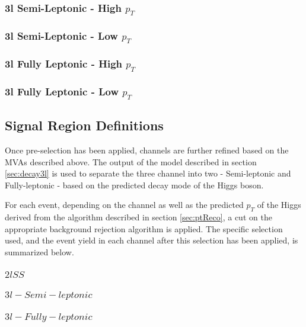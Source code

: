 \subsubsection{3l Semi-Leptonic - High $p_T$}
\label{sec:3lSHigh}

\subsubsection{3l Semi-Leptonic - Low $p_T$}
\label{sec:3lSLow}

\subsubsection{3l Fully Leptonic - High $p_T$}
\label{sec:3lFHigh}

\subsubsection{3l Fully Leptonic - Low $p_T$}
\label{sec:3lFLow}


\subsection{Signal Region Definitions}
\label{subsec:sigRegions}

Once pre-selection has been applied, channels are further refined based on the MVAs described above. The output of the model described in section \ref{sec:decay3l} is used to separate the three channel into two - Semi-leptonic and Fully-leptonic - based on the predicted decay mode of the Higgs boson. 

For each event, depending on the channel as well as the predicted $p_T$ of the Higgs derived from the algorithm described in section \ref{sec:ptReco}, a cut on the appropriate background rejection algorithm is applied. The specific selection used, and the event yield in each channel after this selection has been applied, is summarized below.

\subsubsection{$2lSS$}

\subsubsection{$3l - Semi-leptonic$}

\subsubsection{$3l - Fully-leptonic$}
